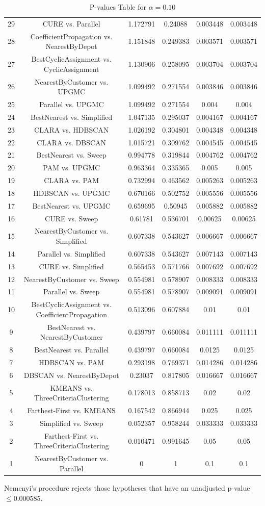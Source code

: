 \documentclass[a4paper,10pt]{article}
\begin{document}
\begin{landscape}
\begin{table}[!htp]
\begin{tabular}{cccccc}
29&CURE vs. Parallel&1.172791&0.24088&0.003448&0.003448\\
28&CoefficientPropagation vs. NearestByDepot&1.151848&0.249383&0.003571&0.003571\\
27&BestCyclicAssignment vs. CyclicAssignment&1.130906&0.258095&0.003704&0.003704\\
26&NearestByCustomer vs. UPGMC&1.099492&0.271554&0.003846&0.003846\\
25&Parallel vs. UPGMC&1.099492&0.271554&0.004&0.004\\
24&BestNearest vs. Simplified&1.047135&0.295037&0.004167&0.004167\\
23&CLARA vs. HDBSCAN&1.026192&0.304801&0.004348&0.004348\\
22&CLARA vs. DBSCAN&1.015721&0.309762&0.004545&0.004545\\
21&BestNearest vs. Sweep&0.994778&0.319844&0.004762&0.004762\\
20&PAM vs. UPGMC&0.963364&0.335365&0.005&0.005\\
19&CLARA vs. PAM&0.732994&0.463562&0.005263&0.005263\\
18&HDBSCAN vs. UPGMC&0.670166&0.502752&0.005556&0.005556\\
17&BestNearest vs. UPGMC&0.659695&0.50945&0.005882&0.005882\\
16&CURE vs. Sweep&0.61781&0.536701&0.00625&0.00625\\
15&NearestByCustomer vs. Simplified&0.607338&0.543627&0.006667&0.006667\\
14&Parallel vs. Simplified&0.607338&0.543627&0.007143&0.007143\\
13&CURE vs. Simplified&0.565453&0.571766&0.007692&0.007692\\
12&NearestByCustomer vs. Sweep&0.554981&0.578907&0.008333&0.008333\\
11&Parallel vs. Sweep&0.554981&0.578907&0.009091&0.009091\\
10&BestCyclicAssignment vs. CoefficientPropagation&0.513096&0.607884&0.01&0.01\\
9&BestNearest vs. NearestByCustomer&0.439797&0.660084&0.011111&0.011111\\
8&BestNearest vs. Parallel&0.439797&0.660084&0.0125&0.0125\\
7&HDBSCAN vs. PAM&0.293198&0.769371&0.014286&0.014286\\
6&DBSCAN vs. NearestByDepot&0.23037&0.817805&0.016667&0.016667\\
5&KMEANS vs. ThreeCriteriaClustering&0.178013&0.858713&0.02&0.02\\
4&Farthest-First vs. KMEANS&0.167542&0.866944&0.025&0.025\\
3&Simplified vs. Sweep&0.052357&0.958244&0.033333&0.033333\\
2&Farthest-First vs. ThreeCriteriaClustering&0.010471&0.991645&0.05&0.05\\
1&NearestByCustomer vs. Parallel&0&1&0.1&0.1\\
\hline
\end{tabular}
\caption{P-values Table for $\alpha=0.10$}
\end{table}Nemenyi's procedure rejects those hypotheses that have an unadjusted p-value $\le0.000585$.


\end{landscape}
\end{document}
